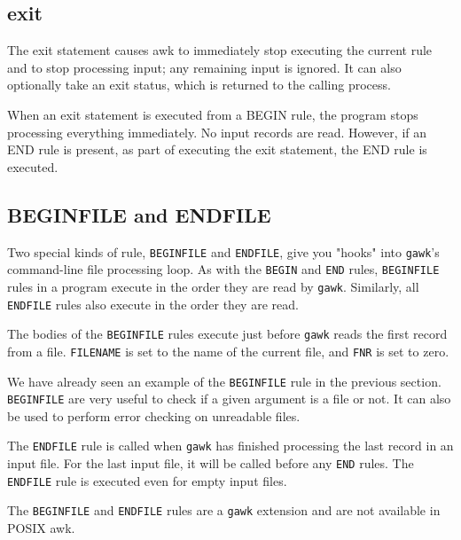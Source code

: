 \subsection{exit}

The exit statement causes awk to immediately stop executing the current rule and to stop processing input; any remaining input is ignored.
It can also optionally take an exit status, which is returned to the calling process.

\begin{remark}
When an exit statement is executed from a BEGIN rule, the program stops processing everything immediately.
No input records are read. However, if an END rule is present, as part of executing the exit statement, the END rule is executed.
\end{remark}

\subsection{BEGINFILE and ENDFILE}
Two special kinds of rule, \lstinline|BEGINFILE| and \lstinline|ENDFILE|, give you "hooks" into \lstinline|gawk|'s command-line file processing loop.
As with the \lstinline|BEGIN| and \lstinline|END| rules,
\lstinline|BEGINFILE| rules in a program execute in the order they are read by \lstinline|gawk|.
Similarly, all \lstinline|ENDFILE| rules also execute in the order they are read.

The bodies of the \lstinline|BEGINFILE| rules execute just before \lstinline|gawk| reads the first record from a file.
\lstinline|FILENAME| is set to the name of the current file, and \lstinline|FNR| is set to zero.

We have already seen an example of the \lstinline|BEGINFILE| rule in the previous section.
\lstinline|BEGINFILE| are very useful to check if a given argument is a file or not.
It can also be used to perform error checking on unreadable files.

The \lstinline|ENDFILE| rule is called when \lstinline|gawk| has finished processing the last record in an input file.
For the last input file, it will be called before any \lstinline|END| rules. 
The \lstinline|ENDFILE| rule is executed even for empty input files.

\begin{remark}
  The \lstinline|BEGINFILE| and \lstinline|ENDFILE| rules are a \lstinline|gawk| extension and are not available in POSIX awk.
\end{remark}

